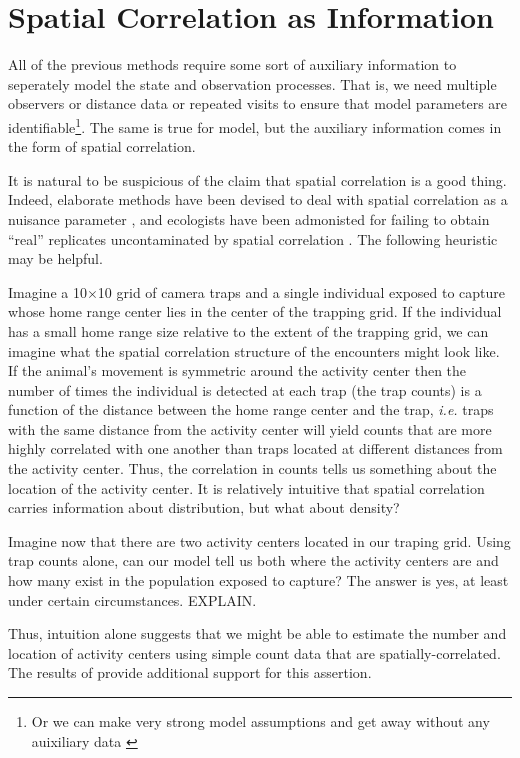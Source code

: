 \section{Spatial Correlation as Information}
\label{sect.corr-info}

All of the previous methods require some sort of auxiliary information
to seperately model the state and observation processes. That is, we
need multiple observers or distance data or repeated visits to ensure
that model parameters are identifiable\footnote{Or we can make very
  strong model assumptions and get away without any auixiliary data
  \citep{lele_etal:2012}}. The same is true for \citep{chandler_royle:2012} model,
but the auxiliary information comes in the form of spatial correlation.

It is natural to be suspicious of the claim that spatial correlation
is a good thing. Indeed, elaborate methods have been devised to deal
with spatial correlation as a nuisance parameter
\citep{dormann_etal:2007}, and ecologists have been admonisted for
failing to obtain ``real'' replicates uncontaminated by spatial
correlation \citep{hurlbert:1984}. The following heuristic may be
helpful.

Imagine a 10$\times$10 grid of camera traps and a single individual
exposed to capture whose home range center lies in the center of the
trapping grid. If the individual has a small home range size relative
to the extent of the trapping grid, we can imagine what the
spatial correlation structure of the encounters might look
like. If the animal's movement is symmetric around the activity center
then the number of times the individual is detected at each
trap (the trap counts) is a function of the distance between the home
range center and the trap, \emph{i.e.} traps with the same distance from the
activity center will yield counts that are more highly correlated with
one another than traps located at different distances from the
activity center. Thus, the correlation in counts tells us something
about the location of the activity center. It is relatively intuitive
that spatial correlation
carries information about distribution, but what about density?

Imagine now that there are two activity centers located in our traping
grid. Using trap counts alone, can our model tell us both where the
activity centers are and how many exist in the population exposed to
capture? The answer is yes, at least under certain circumstances.
EXPLAIN.

Thus, intuition alone suggests that we might be able to estimate the
number and location of activity centers using simple count data that
are spatially-correlated. The results of
\citet{chandler_royle:2012} provide additional support for this
assertion.


